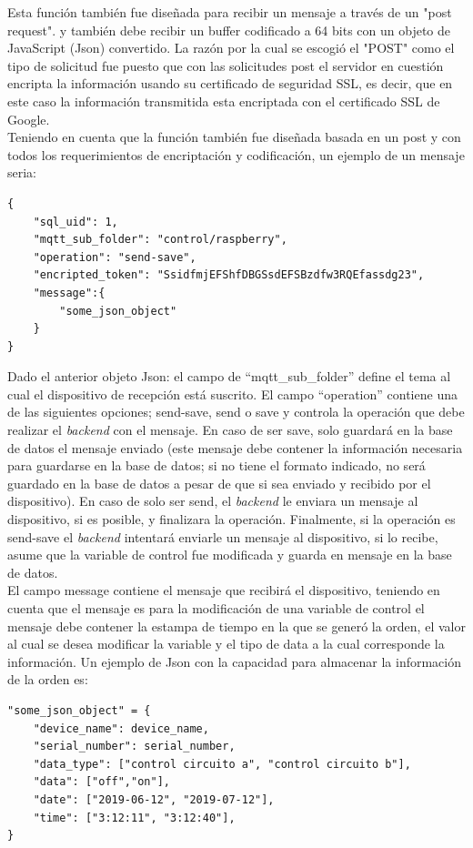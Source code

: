 Esta función también fue diseñada para recibir un mensaje a través de un "post request". y también debe recibir un buffer codificado a 64 bits con un objeto de JavaScript (Json) convertido. La razón por la cual se escogió el "POST" como el tipo de solicitud fue puesto que con las solicitudes post el servidor en cuestión encripta la información usando su certificado de seguridad SSL, es decir, que en este caso la información transmitida esta encriptada con el certificado SSL de Google.
\vspace{0.5cm}\\
Teniendo en cuenta que la función también fue diseñada basada en un post y con todos los requerimientos de encriptación y codificación, un ejemplo de un mensaje seria:
\begin{Verbatim}[tabsize=4]
{
	"sql_uid": 1,
	"mqtt_sub_folder": "control/raspberry",
	"operation": "send-save",
	"encripted_token": "SsidfmjEFShfDBGSsdEFSBzdfw3RQEfassdg23",
	"message":{
		"some_json_object"
	}
}
\end{Verbatim}
Dado el anterior objeto Json: el campo de ``mqtt\_sub\_folder'' define el tema al cual el dispositivo  de recepción está suscrito. El campo ``operation'' contiene una de las siguientes opciones; send-save, send o save y controla la operación que debe realizar el \textit{backend} con el mensaje. En caso de ser save, solo guardará en la base de datos el mensaje enviado (este mensaje debe contener la información necesaria para guardarse en la base de datos; si no tiene el formato indicado, no será guardado en la base de datos a pesar de que si sea enviado y recibido por el dispositivo). En caso de solo ser send, el \textit{backend} le enviara un mensaje al dispositivo, si es posible, y finalizara la operación. Finalmente, si la operación es send-save el \textit{backend} intentará enviarle un mensaje al dispositivo, si lo recibe, asume que la variable de control fue modificada y guarda en mensaje en la base de datos.
\vspace{0.5cm}\\
El campo message contiene el mensaje que recibirá el dispositivo, teniendo en cuenta que el mensaje es para la modificación de una variable de control el mensaje debe contener la estampa de tiempo en la que se generó la orden, el valor al cual se desea modificar la variable y el tipo de data a la cual corresponde la información. Un ejemplo de Json con la capacidad para almacenar la información de la orden es:
\begin{Verbatim}[tabsize=4]
"some_json_object" = {
	"device_name": device_name,
	"serial_number": serial_number,
	"data_type": ["control circuito a", "control circuito b"],
	"data": ["off","on"],
	"date": ["2019-06-12", "2019-07-12"],
	"time": ["3:12:11", "3:12:40"],
}
\end{Verbatim}
